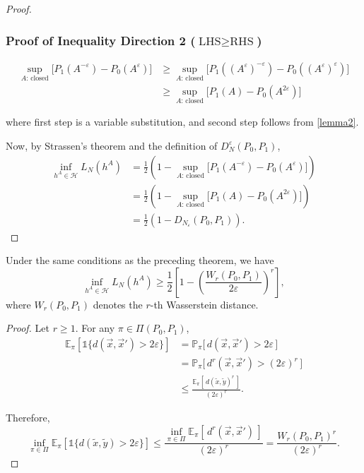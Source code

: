 \documentclass[11pt]{report}
\begin{document}
\begin{proof}
\subsubsection{Proof of Inequality Direction 2 (\( \text{LHS} \ge \text{RHS} \))}

\begin{align*}
\sup_{A \text{: closed}} \big[ P_1(A^{-\varepsilon}) - P_0(A^\varepsilon) \big]
&\ge \sup_{A \text{: closed}} \big[P_1((A^{\varepsilon})^{-\varepsilon}) - P_0((A^{\varepsilon})^{\varepsilon})\big] \\
&\ge \sup_{A \text{: closed}} \big[ P_1(A) - P_0(A^{2\varepsilon})\big]
\end{align*}

\noindent
where first step is a variable substitution, and second step follows from \ref{lemma2}.

\smallskip
\noindent
Now, by Strassen’s theorem and the definition of \( D_N^\varepsilon(P_0, P_1) \),
\begin{align*}
\inf_{h^A \in \mathcal{H}} L_N(h^A)
&= \frac{1}{2}\!\left( 1 - \sup_{A \text{: closed}} \big[ P_1(A^{-\varepsilon}) - P_0(A^{\varepsilon}) \big] \right) \\[0.6em]
&= \frac{1}{2}\!\left( 1 - \sup_{A \text{: closed}} \big[ P_1(A) - P_0(A^{2\varepsilon}) \big] \right) \\[0.6em]
&= \frac{1}{2}\!\left( 1 - D_{N_\varepsilon}(P_0, P_1) \right).
\end{align*}

\end{proof}

\begin{corollary}


Under the same conditions as the preceding theorem, we have
\[
\inf_{h^A \in \mathcal{H}} L_N(h^A)
\ge
\frac{1}{2} \left[ 1 - \left( \frac{W_r(P_0, P_1)}{2\varepsilon} \right)^{\!r} \right],
\]
where \(W_r(P_0, P_1)\) denotes the \(r\)-th Wasserstein distance.
\medskip
\end{corollary}

\begin{proof}
Let \(r \ge 1\). For any \(\pi \in \Pi(P_0, P_1)\),
\begin{align*}
\mathbb{E}_\pi\!\left[\mathds{1}\{ d(\vec{x}, \vec{x}') > 2\varepsilon \}\right]
&= \mathbb{P}_\pi\!\big[\, d(\vec{x}, \vec{x}') > 2\varepsilon \,\big]\\
&= \mathbb{P}_\pi\!\big[\, d^r(\vec{x}, \vec{x}') > (2\varepsilon)^r \,\big]\\
&\le
\frac{\mathbb{E}_\pi[\, d(\tilde{x}, \tilde{y})^r \,]}{(2\varepsilon)^r}.
\end{align*}

\noindent
Therefore,
\[
\inf_{\pi \in \Pi} \mathbb{E}_\pi\!\left[\mathds{1}\{ d(\tilde{x}, \tilde{y}) > 2\varepsilon \}\right]
\le
\frac{\inf_{\pi \in \Pi} \mathbb{E}_\pi[\, d^r(\vec{x}, \vec{x}') \,]}{(2\varepsilon)^r}
= \frac{W_r(P_0, P_1)^r}{(2\varepsilon)^r}.
\]
\end{proof}
\end{document}
